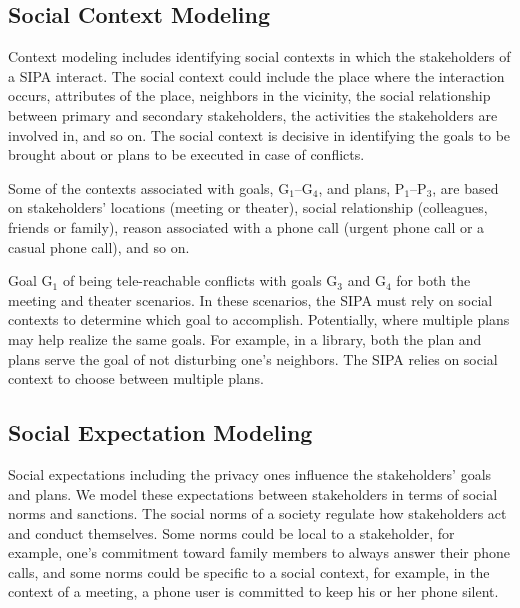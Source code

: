\subsection{Social Context Modeling}

Context modeling includes identifying social contexts in which the
stakeholders of a SIPA interact. The social context could include the
place where the interaction occurs, attributes of the place, neighbors
in the vicinity, the social relationship between primary and secondary
stakeholders, the activities the stakeholders are involved in, and so
on. The social context is decisive in identifying the goals to be
brought about or plans to be executed in case of conflicts.

Some of the contexts associated with goals, G$_1$--G$_4$, and plans,
P$_1$--P$_3$, are based on stakeholders' locations (meeting or theater),
social relationship (colleagues, friends or family), reason
associated with a phone call (urgent phone call or a casual phone
call), and so on.

Goal G$_1$ of being tele-reachable conflicts with goals
G$_3$ and G$_4$ for both the meeting and theater scenarios.
In these scenarios, the SIPA must rely on social
contexts to determine which goal to accomplish. Potentially,
where multiple plans may help realize the same goals. For example, in a
library, both the  plan and 
plans serve the goal of not disturbing one's neighbors. The SIPA
relies on social context to choose between multiple plans. 
  
\subsection{Social Expectation Modeling}

Social expectations including the privacy ones influence the
stakeholders' goals and plans. We model these expectations between
stakeholders in terms of social norms and sanctions. The social norms of
a society regulate how stakeholders act and conduct themselves. Some
norms could be local to a stakeholder, for example, one's commitment
toward family members to always answer their phone calls, and some norms
could be specific to a social context, for example, in the context of a
meeting, a phone user is committed to keep his or her phone silent.

